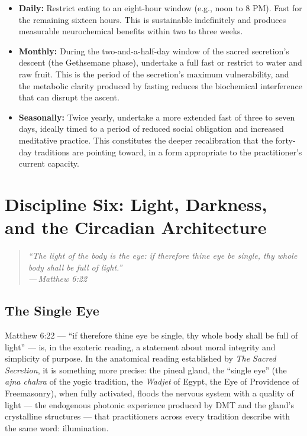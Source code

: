 \documentclass[12pt, a4paper]{article}
\newcommand{\epigraph}[2]{%
  \begin{quote}
    \itshape ``#1''\\[0.3em]
    \normalfont\small\hfill ---\,#2
  \end{quote}
}
\begin{document}
\begin{itemize}[leftmargin=1.5cm]
  \item \textbf{Daily:} Restrict eating to an eight-hour window (e.g., noon
  to 8 PM). Fast for the remaining sixteen hours. This is sustainable
  indefinitely and produces measurable neurochemical benefits within two to
  three weeks.
  \item \textbf{Monthly:} During the two-and-a-half-day window of the sacred
  secretion's descent (the Gethsemane phase), undertake a full fast or
  restrict to water and raw fruit. This is the period of the secretion's
  maximum vulnerability, and the metabolic clarity produced by fasting reduces
  the biochemical interference that can disrupt the ascent.
  \item \textbf{Seasonally:} Twice yearly, undertake a more extended fast of
  three to seven days, ideally timed to a period of reduced social obligation
  and increased meditative practice. This constitutes the deeper recalibration
  that the forty-day traditions are pointing toward, in a form appropriate to
  the practitioner's current capacity.
\end{itemize}

\section{Discipline Six: Light, Darkness, and the Circadian Architecture}
\label{sec:light}

\epigraph{The light of the body is the eye: if therefore thine eye be single,
thy whole body shall be full of light.}{Matthew 6:22}

\subsection{The Single Eye}

Matthew 6:22 — ``if therefore thine eye be single, thy whole body shall be
full of light'' — is, in the exoteric reading, a statement about moral
integrity and simplicity of purpose. In the anatomical reading established by
\emph{The Sacred Secretion}, it is something more precise: the pineal gland,
the ``single eye'' (the \emph{ajna chakra} of the yogic tradition, the
\emph{Wadjet} of Egypt, the Eye of Providence of Freemasonry), when fully
activated, floods the nervous system with a quality of light — the endogenous
photonic experience produced by DMT and the gland's crystalline structures —
that practitioners across every tradition describe with the same word:
illumination.
\end{document}
